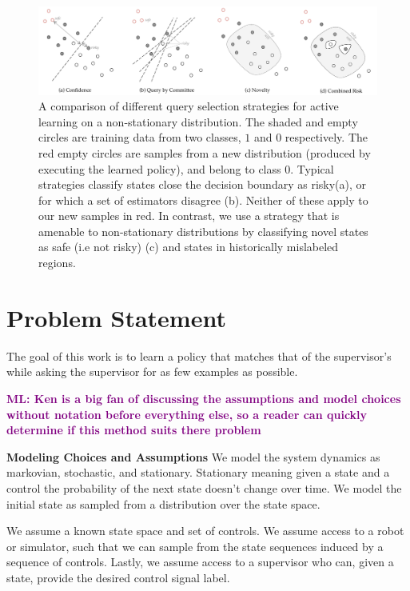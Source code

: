 \documentclass[10pt, conference]{ieeeconf}      %
\newcommand{\mlnote}[1]{\ifthenelse{\boolean{include-notes}}%
 {\textcolor{purple}{\textbf{ML: #1}}}{}}
\begin{document}
\begin{figure}[t]
\centering

\includegraphics[width=\textwidth]{figures/active_learning.pdf}

\caption{A comparison of different query selection strategies for active learning on a non-stationary distribution. The shaded and empty circles are training data from two classes, $1$ and $0$ respectively. The red empty circles are samples from a new distribution (produced by executing the learned policy), and belong to class $0$. Typical strategies classify states close the decision boundary as risky(a), or for which a set of estimators disagree (b). Neither of these apply to our new samples in red. In contrast, we use a strategy that is amenable to non-stationary distributions by classifying  novel states as safe (i.e not risky) (c) and states in historically mislabeled regions. }
\label{fig:support_example}
\end{figure}






\section{Problem Statement}
The goal of this work is to learn a policy that matches that of the supervisor's while asking the supervisor for as few examples as possible.

\mlnote{Ken is a big fan of  discussing the assumptions and model choices without notation before everything else, so a reader can quickly determine if this method suits there problem}

\noindent\textbf{Modeling Choices and Assumptions}  We model the system dynamics as markovian, stochastic, and stationary. Stationary meaning  given a state and a control the probability of the next state doesn't change over time. We model the initial state as sampled from a distribution over the state space.

We assume a known state space and set of controls. We assume access to a robot or simulator, such that we  can sample from the state sequences induced by a sequence of controls.   Lastly, we assume access to a supervisor who can, given a state, provide the desired control signal label. 
\end{document}
